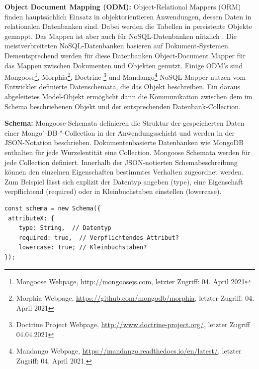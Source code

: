 %
%
%

\noindent
\textbf{Object Document Mapping (ODM):}
Object-Relational Mappers (ORM) finden haupt\-sächlich Einsatz in objektorientieren Anwendungen, dessen Daten in relationalen Datenbanken sind. Dabei werden die Tabellen in persistente Objekte gemappt.
Das Mappen ist aber auch für NoSQL-Datenbanken nützlich \cite{Node2.56}. Die meistverbreiteten NoSQL-Datenbanken basieren auf Dokument-Systemen. Dementsprechend werden für diese Datenbanken Object-Document Mapper für das Mappen zwischen Dokumenten und Objekten genutzt. Einige ODM’s sind Mongoose\footnote{Mongoose Webpage, \url{http://mongoosejs.com}, letzter Zugriff: 04. April 2021}, Morphia\footnote{Morphia Webpage, \url{https://github.com/mongodb/morphia}, letzter Zugriff: 04. April 2021}, Doctrine \footnote{Doctrine Project Webpage, \url{http://www.doctrine-project.org/}, letzter Zugriff 04.04.2021} und Mandango\footnote{Mandango Webpage, \url{https://mandango.readthedocs.io/en/latest/}, letzter Zugriff: 04. April 2021.}
NoSQL Mapper nutzen vom Entwickler definierte Datenschemata, die das Objekt beschreiben. Ein daraus abgeleitetes Model-Objekt ermöglicht dann die Kommunikation zwischen dem im Schema beschriebenen Objekt und der entsprechenden Datenbank-Collection.
\newline

%
%
%

\noindent
\textbf{Schema:}
Mongoose-Schemata definieren die Struktur der gespeicherten Daten einer Mongo"-DB-"-Collection in der Anwendungsschicht und werden in der JSON-Notation beschrieben. Dokumentenbasierte Datenbanken wie MongoDB enthalten für jede Wurzelentität eine Collection. Mongoose Schemata werden für jede Collection definiert. Innerhalb der JSON-notierten Schemabeschreibung können den einzelnen Eigenschaften bestimmtes Verhalten zugeordnet werden. Zum Beispiel lässt sich explizit der Datentyp angeben (type), eine Eigenschaft verpflichtend (required) oder in Kleinbuchstaben einstellen (lowercase).
\newline


\begin{lstlisting}[caption=Mongoose Schema - Beispiel,label=lst:MongooseSchema]
const schema = new Schema({
 attributeX: {
 	type: String,  // Datentyp
 	required: true,  // Verpflichtendes Attribut?
 	lowercase: true; // Kleinbuchstaben?
});
\end{lstlisting}

%
%
%

